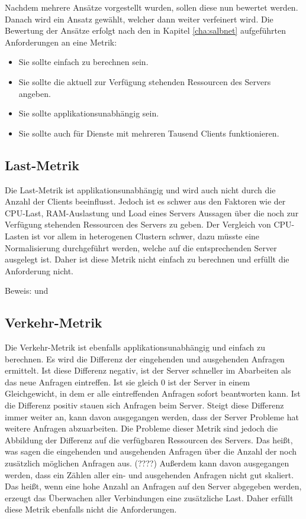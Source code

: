 \documentclass[a4paper, 12pt, BCOR10mm, DIV12, toc=bibliography, toc=listof, german]{scrbook}
\begin{document}
		Nachdem mehrere Ansätze vorgestellt wurden, sollen diese nun bewertet werden. Danach wird ein
		Ansatz gewählt, welcher dann weiter verfeinert wird. Die Bewertung der Ansätze erfolgt nach den
		in Kapitel \ref{cha:salbnet} aufgeführten Anforderungen an eine Metrik:

		\begin{itemize}
			\item Sie sollte einfach zu berechnen sein.
			\item Sie sollte die aktuell zur Verfügung stehenden Ressourcen des Servers angeben.
			\item Sie sollte applikationsunabhängig sein.
			\item Sie sollte auch für Dienste mit mehreren Tausend Clients funktionieren.
		\end{itemize}

		\subsection*{Last-Metrik} %

		Die Last-Metrik ist applikationsunabhängig und wird auch nicht durch die Anzahl der Clients
		beeinflusst. Jedoch ist es schwer aus den Faktoren wie der CPU-Last, RAM-Auslastung und Load
		eines Servers Aussagen über die noch zur Verfügung stehenden Ressourcen des Servers zu geben.
		Der Vergleich von CPU-Lasten ist vor allem in heterogenen Clustern schwer, dazu müsste eine
		Normalisierung durchgeführt werden, welche auf die entsprechenden Server ausgelegt ist. Daher
		ist diese Metrik nicht einfach zu berechnen und erfüllt die Anforderung nicht.

		Beweis: \cite{kunz1991} und \cite{lansch1994}


		\subsection*{Verkehr-Metrik} %

		Die Verkehr-Metrik ist ebenfalls applikationsunabhängig und einfach zu berechnen. Es wird die
		Differenz der eingehenden und ausgehenden Anfragen ermittelt. Ist diese Differenz negativ, ist
		der Server schneller im Abarbeiten als das neue Anfragen eintreffen. Ist sie gleich 0 ist der
		Server in einem Gleichgewicht, in dem er alle eintreffenden Anfragen sofort beantworten kann.
		Ist die Differenz positiv stauen sich Anfragen beim Server. Steigt diese Differenz immer
		weiter an, kann davon ausgegangen werden, dass der Server Probleme hat weitere Anfragen
		abzuarbeiten. Die Probleme dieser Metrik sind jedoch die Abbildung der Differenz auf die
		verfügbaren Ressourcen des Servers. Das heißt, was sagen die eingehenden und ausgehenden Anfragen
		über die Anzahl der noch zusätzlich möglichen Anfragen aus. (????) Außerdem kann davon ausgegangen
		werden, dass ein Zählen aller ein- und ausgehenden Anfragen nicht gut skaliert. Das heißt, wenn
		eine hohe Anzahl an Anfragen auf den Server abgegeben werden, erzeugt das Überwachen aller
		Verbindungen eine zusätzliche Last. Daher erfüllt diese Metrik ebenfalls nicht die
		Anforderungen.
		
\end{document}
